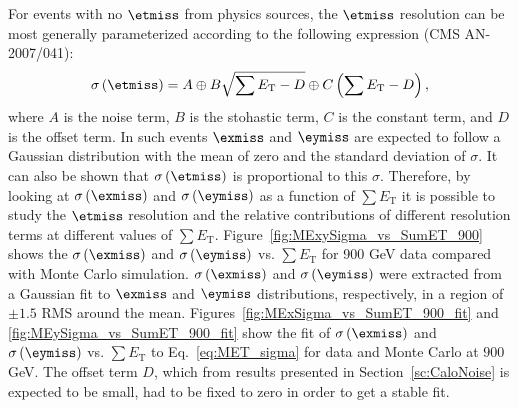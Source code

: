 For events with no $\etmiss$ from physics sources, the $\etmiss$ resolution can be most generally parameterized
according to the following expression (CMS AN-2007/041):
\begin{equation}
  \sigma\left(\etmiss\right)=A \oplus B\sqrt{\sum E_\text{T}-D} \oplus C\left(\sum E_\text{T}-D\right),
  \label{eq:MET_sigma}
\end{equation}
where $A$ is the noise term, $B$ is the stohastic term, $C$ is the constant term, and $D$ is the offset term. In such events
$\exmiss$ and $\eymiss$ are expected to follow a Gaussian distribution with the mean of zero and the standard deviation
of $\sigma$. It can also be shown that $\sigma\left(\etmiss\right)$ is proportional to this $\sigma$. Therefore,
by looking at $\sigma\left(\exmiss\right)$ and $\sigma\left(\eymiss\right)$ as a function of $\sum E_\text{T}$ it is possible to
study the $\etmiss$ resolution and the relative contributions of different resolution terms at different values of $\sum E_\text{T}$.
Figure~\ref{fig:MExySigma_vs_SumET_900} shows the $\sigma\left(\exmiss\right)$ and $\sigma\left(\eymiss\right)$ 
vs. $\sum E_\text{T}$ for 900 GeV data compared with Monte Carlo simulation. $\sigma\left(\exmiss\right)$ and $\sigma\left(\eymiss\right)$
were extracted from a Gaussian fit to $\exmiss$ and $\eymiss$ distributions, respectively, in a region of $\pm 1.5$ RMS around the mean.
Figures~\ref{fig:MExSigma_vs_SumET_900_fit} and \ref{fig:MEySigma_vs_SumET_900_fit} show the fit of $\sigma\left(\exmiss\right)$
 and $\sigma\left(\eymiss\right)$ vs. $\sum E_\text{T}$ to Eq.~\ref{eq:MET_sigma} for data and Monte Carlo at $900$ GeV.
The offset term $D$, which from results presented in Section~\ref{sc:CaloNoise} is expected to be small, had to be fixed to zero in 
order to get a stable fit.

